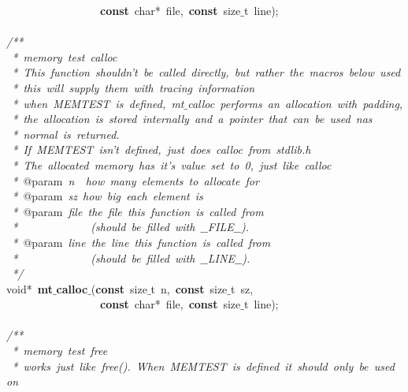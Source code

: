 \documentclass{article}
\begin{document}
\mbox{}\ \ \ \ \ \ \ \ \ \ \ \ \ \ \ \ \ \textbf{const}\ char*\ file,\ \textbf{const}\ size$\_$t\ line); \\
\mbox{} \\
\mbox{}\textit{/**} \\
\mbox{}\textit{\ *\ memory\ test\ calloc} \\
\mbox{}\textit{\ *\ This\ function\ shouldn't\ be\ called\ directly,\ but\ rather\ the\ macros\ below\ used} \\
\mbox{}\textit{\ *\ this\ will\ supply\ them\ with\ tracing\ information} \\
\mbox{}\textit{\ *\ when\ MEMTEST\ is\ defined,\ mt$\_$calloc\ performs\ an\ allocation\ with\ padding,} \\
\mbox{}\textit{\ *\ the\ allocation\ is\ stored\ internally\ and\ a\ pointer\ that\ can\ be\ used\ nas} \\
\mbox{}\textit{\ *\ normal\ is\ returned.} \\
\mbox{}\textit{\ *\ If\ MEMTEST\ isn't\ defined,\ just\ does\ calloc\ from\ stdlib.h} \\
\mbox{}\textit{\ *\ The\ allocated\ memory\ has\ it's\ value\ set\ to\ 0,\ just\ like\ calloc} \\
\mbox{}\textit{\ *\ }@param\textit{\ n\ \ how\ many\ elements\ to\ allocate\ for} \\
\mbox{}\textit{\ *\ }@param\textit{\ sz\ how\ big\ each\ element\ is} \\
\mbox{}\textit{\ *\ }@param\textit{\ file\ the\ file\ this\ function\ is\ called\ from} \\
\mbox{}\textit{\ *\ \ \ \ \ \ \ \ \ \ \ \ \ (should\ be\ filled\ with\ $\_$$\_$FILE$\_$$\_$).} \\
\mbox{}\textit{\ *\ }@param\textit{\ line\ the\ line\ this\ function\ is\ called\ from} \\
\mbox{}\textit{\ *\ \ \ \ \ \ \ \ \ \ \ \ \ (should\ be\ filled\ with\ $\_$$\_$LINE$\_$$\_$).} \\
\mbox{}\textit{\ */} \\
\mbox{}void*\ \textbf{mt$\_$calloc$\_$}(\textbf{const}\ size$\_$t\ n,\ \textbf{const}\ size$\_$t\ sz, \\
\mbox{}\ \ \ \ \ \ \ \ \ \ \ \ \ \ \ \ \ \textbf{const}\ char*\ file,\ \textbf{const}\ size$\_$t\ line); \\
\mbox{} \\
\mbox{}\textit{/**} \\
\mbox{}\textit{\ *\ memory\ test\ free} \\
\mbox{}\textit{\ *\ works\ just\ like\ free().\ When\ MEMTEST\ is\ defined\ it\ should\ only\ be\ used\ on} \\
\end{document}
